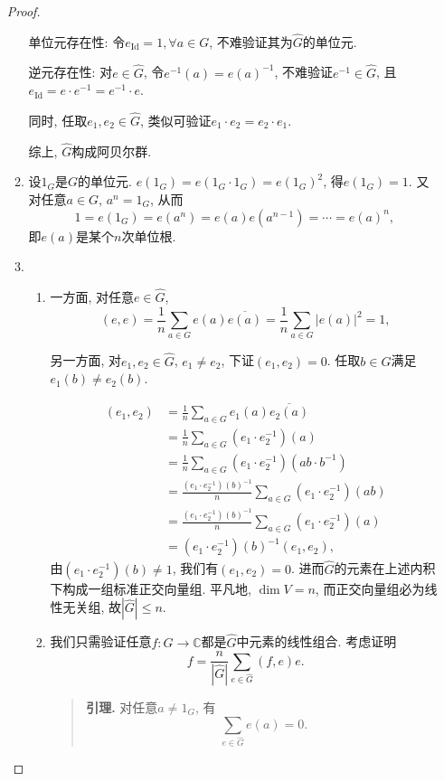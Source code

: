 \documentclass[lang=cn,12pt,a4paper]{elegantpaper.cls}
\begin{document}
\begin{enumerate}
\begin{proof}
\begin{enumerate}
		单位元存在性: 令$e_{\mathrm{Id}}=1,\forall a\in G$, 不难验证其为$\hat{G}$的单位元.
		
		逆元存在性: 对$e\in \hat{G}$, 令$e^{-1}(a)=e(a)^{-1}$, 不难验证$e^{-1}\in\hat{G}$, 且$e_{\mathrm{Id}}=e\cdot e^{-1}=e^{-1}\cdot e$.
		
		同时, 任取$e_1,e_2\in \hat{G}$, 类似可验证$e_1\cdot e_2=e_2\cdot e_1$.
		
		综上, $\hat{G}$构成阿贝尔群.
		
		\item 设$1_G$是$G$的单位元. $e(1_G)=e(1_G\cdot 1_G)=e(1_G)^2$, 得$e(1_G)=1$. 又对任意$a\in G$, $a^n=1_G$, 从而\[1=e(1_G)=e(a^{n})=e(a)e(a^{n-1})=\cdots=e(a)^n,\]即$e(a)$是某个$n$次单位根.
		
		\item 
		\begin{enumerate}[label=(\roman*)]
		\item  一方面, 对任意$e\in \hat{G}$, \[(e,e)=\frac{1}{n}\sum_{a\in G}e(a)\overline{e(a)}=\frac{1}{n}\sum_{a\in G}|e(a)|^2=1,\]
		
		另一方面, 对$e_1,e_2\in \hat{G}$, $e_1\neq e_2$, 下证$(e_1,e_2)=0$. 任取$b\in G$满足$e_1(b)\neq e_2(b)$. 
		
		\[\begin{aligned}
			(e_1,e_2)&=\frac{1}{n}\sum_{a\in G}e_1(a)\overline{e_2(a)}\\&=\frac{1}{n}\sum_{a\in G}(e_1\cdot e_2^{-1})(a)\\&=\frac{1}{n}\sum_{a\in G}(e_1\cdot e_2^{-1})(ab\cdot b^{-1})\\&=\frac{(e_1\cdot e_2^{-1})(b)^{-1}}{n}\sum_{a\in G}(e_1\cdot e_2^{-1})(ab)\\&=\frac{(e_1\cdot e_2^{-1})(b)^{-1}}{n}\sum_{a\in G}(e_1\cdot e_2^{-1})(a)\\&=(e_1\cdot e_2^{-1})(b)^{-1}(e_1,e_2),
		\end{aligned}\]由$(e_1\cdot e_2^{-1})(b)\neq 1$, 我们有$(e_1,e_2)=0$. 进而$\hat{G}$的元素在上述内积下构成一组标准正交向量组. 平凡地, $\dim V=n$, 而正交向量组必为线性无关组, 故$|\hat{G}|\leq n$.
		
		\item  我们只需验证任意$f:G\to \mathbb C$都是$\hat{G}$中元素的线性组合. 考虑证明\[f=\frac{n}{|\hat{G}|}\sum_{e\in \hat{G}}(f,e)e.\]
		
		\begin{quote}
			\textbf{引理.} 对任意$a\neq 1_G$, 有\[\sum_{e\in\hat{G}}e(a)=0.\]
		

\end{quote}
\end{enumerate}
\end{enumerate}
\end{proof}
\end{enumerate}
\end{document}

